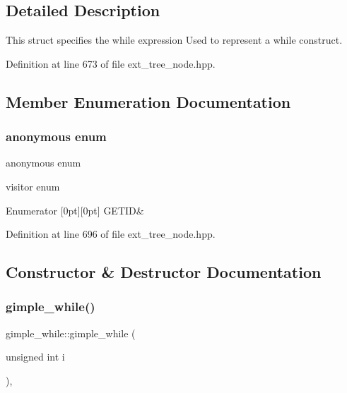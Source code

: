 \subsection{Detailed Description}
This struct specifies the while expression Used to represent a while construct. 

Definition at line 673 of file ext\+\_\+tree\+\_\+node.\+hpp.



\subsection{Member Enumeration Documentation}
\mbox{\label{structgimple__while_ae79425448cd553a37f2ce72f324bceeb}} 
\subsubsection{\texorpdfstring{anonymous enum}{anonymous enum}}
{\footnotesize\ttfamily anonymous enum}



visitor enum 

\begin{DoxyEnumFields}{Enumerator}
[0pt][0pt]{}\mbox{\label{structgimple__while_ae79425448cd553a37f2ce72f324bceeba0289db4fdfcc2857f52829764cef2f04}} 
G\+E\+T\+ID&\\
\hline

\end{DoxyEnumFields}


Definition at line 696 of file ext\+\_\+tree\+\_\+node.\+hpp.



\subsection{Constructor \& Destructor Documentation}
\mbox{\label{structgimple__while_a99fb6e775f0131a45752665eb25f0506}} 
\subsubsection{\texorpdfstring{gimple\+\_\+while()}{gimple\_while()}}
{\footnotesize\ttfamily gimple\+\_\+while\+::gimple\+\_\+while (\begin{DoxyParamCaption}\item[{unsigned int}]{i }\end{DoxyParamCaption})\hspace{0.3cm}{\ttfamily [inline]}, {\ttfamily [explicit]}}



